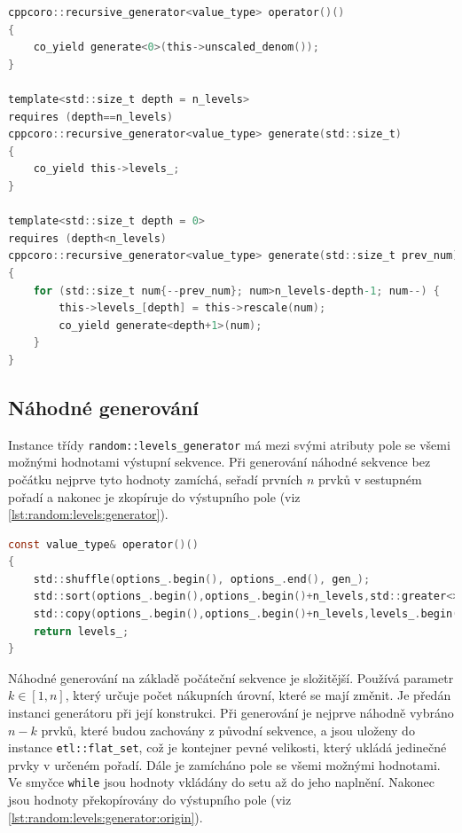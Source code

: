 \begin{lstlisting}[caption={~Metody pro systematické generování úrovní nákupu},label={lst:systematic:levels_generator},captionpos=t,abovecaptionskip=-\medskipamount,belowcaptionskip=\medskipamount,language=C]
cppcoro::recursive_generator<value_type> operator()()
{
    co_yield generate<0>(this->unscaled_denom());
}

template<std::size_t depth = n_levels>
requires (depth==n_levels)
cppcoro::recursive_generator<value_type> generate(std::size_t)
{
    co_yield this->levels_;
}

template<std::size_t depth = 0>
requires (depth<n_levels)
cppcoro::recursive_generator<value_type> generate(std::size_t prev_num)
{
    for (std::size_t num{--prev_num}; num>n_levels-depth-1; num--) {
        this->levels_[depth] = this->rescale(num);
        co_yield generate<depth+1>(num);
    }
}
\end{lstlisting}

\subsection{Náhodné generování}
Instance třídy \texttt{random::levels\_generator} má mezi svými atributy pole se všemi možnými hodnotami výstupní sekvence.
Při generování náhodné sekvence bez počátku nejprve tyto hodnoty zamíchá, seřadí prvních $n$ prvků v sestupném pořadí a nakonec je zkopíruje do výstupního pole (viz \ref{lst:random:levels:generator}).

\begin{lstlisting}[caption={~Metoda pro náhodné generování úrovní nákupu bez počátku},label={lst:random:levels:generator},captionpos=t,abovecaptionskip=-\medskipamount,belowcaptionskip=\medskipamount,language=C]
const value_type& operator()()
{
    std::shuffle(options_.begin(), options_.end(), gen_);
    std::sort(options_.begin(),options_.begin()+n_levels,std::greater<>());
    std::copy(options_.begin(),options_.begin()+n_levels,levels_.begin());
    return levels_;
}
\end{lstlisting}

Náhodné generování na základě počáteční sekvence je složitější.
Používá parametr $k \in [1, n] $, který určuje počet nákupních úrovní, které se mají změnit.
Je předán instanci generátoru při její konstrukci.
Při generování je nejprve náhodně vybráno $n-k$ prvků, které budou zachovány z původní sekvence, a jsou uloženy do instance \texttt{etl::flat\_set}, což je kontejner pevné velikosti, který ukládá jedinečné prvky v určeném pořadí.
Dále je zamícháno pole se všemi možnými hodnotami.
Ve smyčce \texttt{while} jsou hodnoty vkládány do setu až do jeho naplnění.
Nakonec jsou hodnoty překopírovány do výstupního pole (viz \ref{lst:random:levels:generator:origin}).

